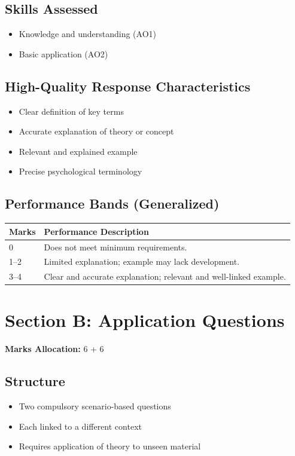 \documentclass[12pt,a4paper]{article}
\begin{document}
\subsection*{Skills Assessed}
\begin{itemize}
    \item Knowledge and understanding (AO1)
    \item Basic application (AO2)
\end{itemize}

\subsection*{High-Quality Response Characteristics}
\begin{itemize}
    \item Clear definition of key terms
    \item Accurate explanation of theory or concept
    \item Relevant and explained example
    \item Precise psychological terminology
\end{itemize}

\subsection*{Performance Bands (Generalized)}

\begin{longtable}{p{1.5cm} p{12cm}}
\toprule
\textbf{Marks} & \textbf{Performance Description} \\
\midrule
0 & Does not meet minimum requirements. \\
1--2 & Limited explanation; example may lack development. \\
3--4 & Clear and accurate explanation; relevant and well-linked example. \\
\bottomrule
\end{longtable}

\newpage

\section{Section B: Application Questions}

\textbf{Marks Allocation:} 6 + 6

\subsection*{Structure}
\begin{itemize}
    \item Two compulsory scenario-based questions
    \item Each linked to a different context
    \item Requires application of theory to unseen material
\end{itemize}
\end{document}
